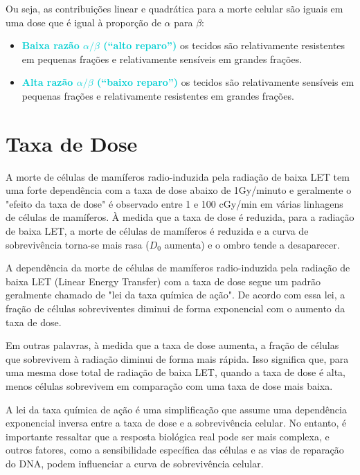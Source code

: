 \documentclass[11pt,a4paper]{article}
\begin{document}
	Ou seja, as contribuições linear e quadrática para a morte celular são iguais em uma dose que é igual à proporção de $\alpha$ para $\beta$:

	\begin{itemize}
		\item \textcolor{DarkTurquoise}{\textbf{Baixa razão $\alpha/\beta$  (“alto reparo”)}} os tecidos são relativamente resistentes em pequenas frações e relativamente sensíveis em grandes frações.
		\item \textcolor{DarkTurquoise}{\textbf{Alta razão $\alpha/\beta$ (“baixo reparo”)}} os tecidos são relativamente sensíveis em pequenas frações e relativamente resistentes em grandes frações.
	\end{itemize}


\section{Taxa de Dose}

	A morte de células de mamíferos radio-induzida pela radiação de baixa LET tem uma forte dependência com a taxa de dose abaixo de 1Gy/minuto e geralmente o "efeito da taxa de dose" é observado entre 1 e 100 cGy/min em várias linhagens de células de mamíferos. À medida que a taxa de dose é reduzida, para a radiação de baixa LET, a morte de células de mamíferos é reduzida e a curva de sobrevivência torna-se mais rasa ($D_0$ aumenta) e o ombro tende a desaparecer.

	A dependência da morte de células de mamíferos radio-induzida pela radiação de baixa LET (Linear Energy Transfer) com a taxa de dose segue um padrão geralmente chamado de "lei da taxa química de ação". De acordo com essa lei, a fração de células sobreviventes diminui de forma exponencial com o aumento da taxa de dose. 

	Em outras palavras, à medida que a taxa de dose aumenta, a fração de células que sobrevivem à radiação diminui de forma mais rápida. Isso significa que, para uma mesma dose total de radiação de baixa LET, quando a taxa de dose é alta, menos células sobrevivem em comparação com uma taxa de dose mais baixa.

	A lei da taxa química de ação é uma simplificação que assume uma dependência exponencial inversa entre a taxa de dose e a sobrevivência celular. No entanto, é importante ressaltar que a resposta biológica real pode ser mais complexa, e outros fatores, como a sensibilidade específica das células e as vias de reparação do DNA, podem influenciar a curva de sobrevivência celular.
\end{document}
